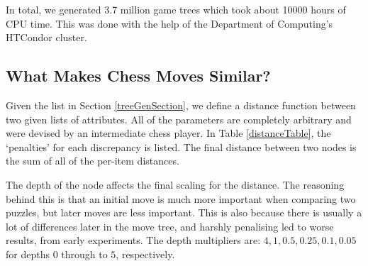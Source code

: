 In total, we generated 3.7 million game trees which took about 10000 hours of
CPU time. This was done with the help of the Department of Computing's HTCondor
cluster.

\subsection{What Makes Chess Moves Similar?}

Given the list in Section \ref{treeGenSection}, we define a distance function
between two given lists of attributes. All of the parameters are completely
arbitrary and were devised by an intermediate chess player. In Table
\ref{distanceTable}, the `penalties' for each discrepancy is listed. The final
distance between two nodes is the sum of all of the per-item distances.

The depth of the node affects the final scaling for the distance. The reasoning
behind this is that an initial move is much more important when comparing two
puzzles, but later moves are less important. This is also because there is
usually a lot of differences later in the move tree, and harshly penalising led
to worse results, from early experiments. The depth multipliers are: $4, 1,
0.5, 0.25, 0.1, 0.05$ for depths $0$ through to $5$, respectively.

